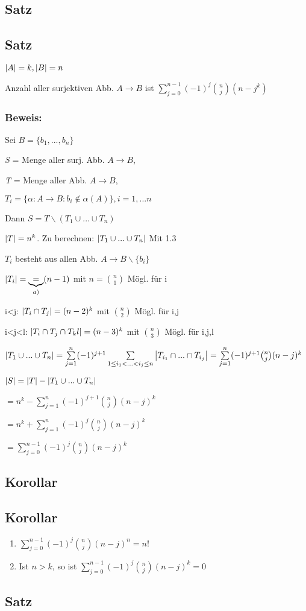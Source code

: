 \subsection{Satz}%
\subsection{Satz}
$\left|A\right|=k, \left|B\right|=n$

Anzahl aller surjektiven Abb. $A \rightarrow B$ ist $\sum_{j=0}^{n-1}(-1)^j \binom{n}{j}(n-j^k)$

\subsubsection*{Beweis:}
Sei $B = \{b_1,...,b_n  \}$

\textit{S} = Menge aller surj. Abb. $A \rightarrow B$,

\textit{T} = Menge aller Abb.  $A \rightarrow B$,

$T_i = \{\alpha: A \rightarrow B: b_i \notin \alpha (A)  \}, i=1,...n$

Dann $S=T\backslash(T_1\cup ... \cup T_n)$

$\left|T\right| = n^k$. Zu berechnen: $\left|T_1 \cup ... \cup T_n\right|$ Mit 1.3 %

$T_i$ besteht aus allen Abb. $A\rightarrow B\backslash\{b_i\}$

$\left|T_i\right| = \underbrace{=}_{a)} (n-1)$ mit $n= \binom{n}{1}$  Mögl. für i

i<j: $\left|T_i \cap T_j\right| = (n-2)^k$ mit $\binom{n}{2}$ Mögl. für i,j

i<j<l: $\left|T_i \cap T_j \cap T_kl\right| = (n-3)^k$ mit $\binom{n}{3}$ Mögl. für i,j,l

$\abs{T_1 \cup ...\cup T_n} = \sum_{j=1}^{n}(-1)^{j+1} \sum_{1\leq i_1<...<i_j\leq n}\abs{T_{i_1}\cap ... \cap T_{i_j}} = \sum_{j=1}^{n}(-1)^{j+1} \binom{n}{j}(n-j)^k$

$\left|S\right|= \left|T\right|-\left|T_1 \cup ... \cup T_n\right|$

$= n^k-\sum_{j=1}^{n}(-1)^{j+1}\binom{n}{j}(n-j)^{k}$

$= n^k+\sum_{j=1}^{n}(-1)^{j}\binom{n}{j}(n-j)^{k}$

$= \sum_{j=0}^{n-1}(-1)^{j}\binom{n}{j}(n-j)^{k}$

\subsection{Korollar}%
\subsection{Korollar}
\begin{enumerate}
	\item $\sum_{j=0}^{n-1}(-1)^j\binom{n}{j}(n-j)^n = n!$
	
	\item Ist $n>k$, so ist $\sum_{j=0}^{n-1}(-1)^j\binom{n}{j}(n-j)^k=0$
\end{enumerate}
\subsection{Satz}%
